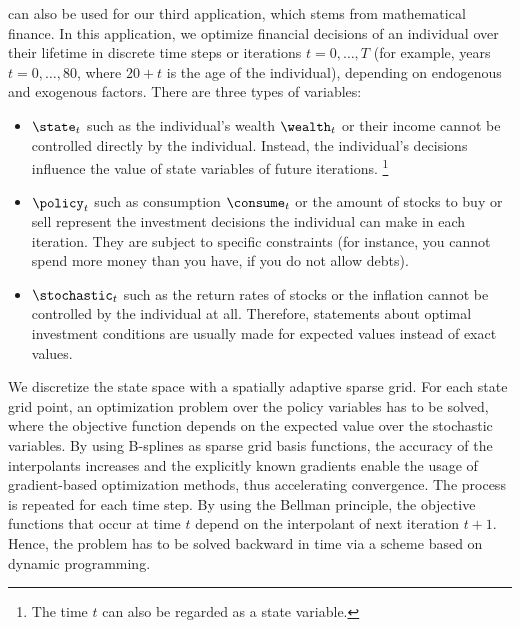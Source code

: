 
\label{chap:80finance}

can also be used for our third application,
which stems from mathematical finance.
In this application, we optimize financial decisions of an individual
over their lifetime in discrete time steps or iterations $t = 0, \dotsc, T$
(for example, years $t = 0, \dotsc, 80$, where $20+t$ is the age
of the individual), depending on endogenous and exogenous factors.
There are three types of variables:

\begin{itemize}
  \item
   $\state_t$
  such as the individual's wealth $\wealth_t$ or their income
  cannot be controlled directly by the individual.
  Instead, the individual's decisions influence the value of
  state variables of future iterations.%
  \footnote{%
    The time $t$ can also be regarded as a state variable.%
  }
  
  \item
   $\policy_t$
  such as consumption $\consume_t$ or the amount of stocks to buy or sell
  represent the investment decisions the individual can make in
  each iteration.
  They are subject to specific constraints
  (for instance, you cannot spend more money than you have,
  if you do not allow debts).
  
  \item
   $\stochastic_t$
  such as the return rates of stocks or the inflation
  cannot be controlled by the individual at all.
  Therefore, statements about optimal investment conditions
  are usually made for expected values instead of exact values.
\end{itemize}

\noindent
We discretize the state space with a spatially adaptive sparse grid.
For each state grid point, an optimization problem over the policy
variables has to be solved, where the objective function depends
on the expected value over the stochastic variables.
By using B-splines as sparse grid basis functions,
the accuracy of the interpolants increases and
the explicitly known gradients enable the usage of
gradient-based optimization methods, thus accelerating convergence.
The process is repeated for each time step.
By using the Bellman principle, the objective functions that
occur at time $t$ depend on the interpolant of next iteration $t+1$.
Hence, the problem has to be solved backward in time
via a scheme based on dynamic programming.

